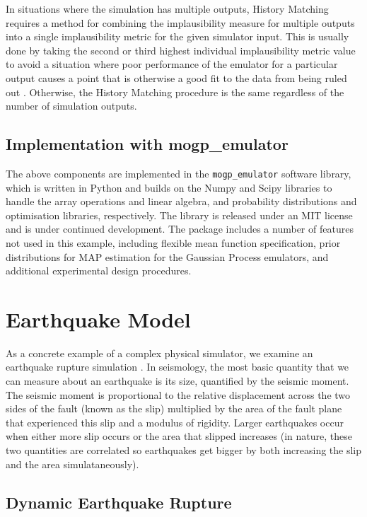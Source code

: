 \documentclass[openacc]{rstransa}%
\begin{document}
In situations where the simulation has multiple outputs, History Matching
requires a method for combining the implausibility measure for multiple
outputs into a single implausibility metric for the given simulator input.
This is usually done by taking the second or third highest individual
implausibility metric value to avoid a situation where poor performance of
the emulator for a particular output causes a point that is otherwise a
good fit to the data from being ruled out \cite{vernon2014}. Otherwise,
the History Matching procedure is the same regardless of the number of
simulation outputs.

\subsection{Implementation with mogp\_emulator}

The above components are implemented in the \texttt{mogp\_emulator} software library, which is
written in Python and builds on the Numpy and Scipy libraries \cite{2020NumPy-Array, 2020SciPy-NMeth} to handle the array operations and
linear algebra, and probability distributions and optimisation libraries, respectively. The
library is released under an MIT license and is under continued development. The
package includes a number of features not used in this example, including flexible mean function
specification, prior distributions for MAP estimation for the Gaussian Process emulators, and additional
experimental design procedures.

\section{Earthquake Model}

As a concrete example of a complex physical simulator, we examine an earthquake rupture simulation
\cite{earthquakedynamics,daubcarlson}.
In seismology, the most basic quantity that we can measure about an earthquake is its size,
quantified by the seismic moment. The seismic moment is proportional to the relative displacement across the
two sides of the fault (known as the slip) multiplied by the area of the fault plane that experienced this slip
and a modulus of rigidity. Larger earthquakes occur when either more slip occurs or the area that slipped
increases (in nature, these two quantities are correlated so earthquakes get bigger by both increasing the slip
and the area simulataneously).

\subsection{Dynamic Earthquake Rupture}
\end{document}
